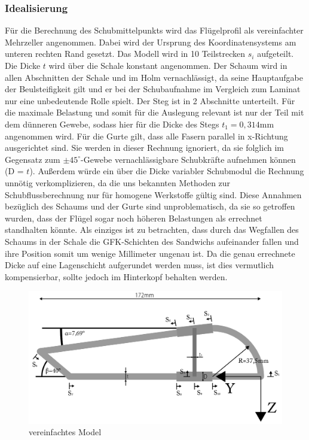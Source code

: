 \subsubsection{Idealisierung}
Für die Berechnung des Schubmittelpunkts wird das Flügelprofil als vereinfachter Mehrzeller angenommen.
Dabei wird der Ursprung des Koordinatensystems am unteren rechten Rand gesetzt. Das Modell wird in 10 Teilstrecken $s_{i}$ aufgeteilt. Die Dicke $t$ wird über die Schale konstant angenommen. Der Schaum wird in allen Abschnitten der Schale und im Holm vernachlässigt, da seine Hauptaufgabe der Beulsteifigkeit gilt und er bei der Schubaufnahme im Vergleich zum Laminat nur eine unbedeutende Rolle spielt. Der Steg ist in 2 Abschnitte unterteilt. Für die maximale Belastung und somit für die Auslegung relevant ist nur der Teil mit dem dünneren Gewebe, sodass hier für die Dicke des Stegs $t_{1}=0,314\mathrm{mm}$ angenommen wird. Für die Gurte gilt, dass alle Fasern parallel in x-Richtung ausgerichtet sind. Sie werden in dieser Rechnung ignoriert, da sie folglich im Gegensatz zum $\pm45^\circ$-Gewebe vernachlässigbare Schubkräfte aufnehmen können (D = $t$). Außerdem würde ein über die Dicke variabler Schubmodul die Rechnung unnötig verkomplizieren, da die uns bekannten Methoden zur Schubflussberechnung nur für homogene Werkstoffe gültig sind.
Diese Annahmen bezüglich des Schaums und der Gurte sind unproblematisch, da sie so getroffen wurden, dass der Flügel sogar noch höheren Belastungen als errechnet standhalten könnte. Als einziges ist zu betrachten, dass durch das Wegfallen des Schaums in der Schale die GFK-Schichten des Sandwichs aufeinander fallen und ihre Position somit um wenige Millimeter ungenau ist. Da die genau errechnete Dicke auf eine Lagenschicht aufgerundet werden muss, ist dies vermutlich kompensierbar, sollte jedoch im Hinterkopf behalten werden.
\begin{figure}[h]
 \centering
 \includegraphics[width=1\textwidth]{Bilder/Model1}
 \caption{vereinfachtes Model}
 \label{Fluegel1}
\end{figure}
